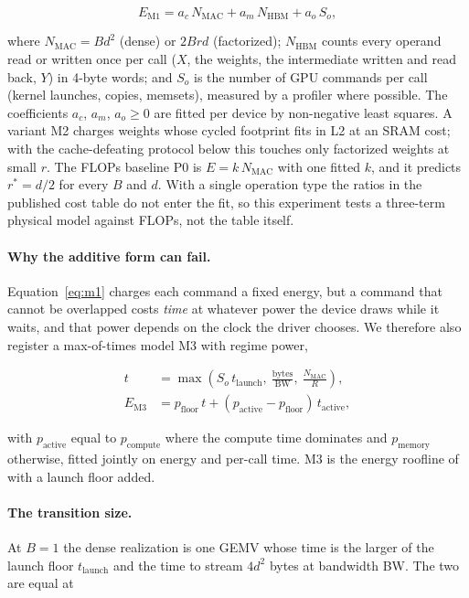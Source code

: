 \documentclass{article}
\newcommand{\rstar}{r^{*}}
\begin{document}
\begin{equation}
E_{\mathrm{M1}} = a_c\, N_{\mathrm{MAC}} + a_m\, N_{\mathrm{HBM}} + a_o\, S_o,
\label{eq:m1}
\end{equation}

where $N_{\mathrm{MAC}} = B d^2$ (dense) or $2 B r d$ (factorized); $N_{\mathrm{HBM}}$ counts every operand read or written once per call ($X$, the weights, the intermediate written and read back, $Y$) in 4-byte words; and $S_o$ is the number of GPU commands per call (kernel launches, copies, memsets), measured by a profiler where possible. The coefficients $a_c$, $a_m$, $a_o \geq 0$ are fitted per device by non-negative least squares. A variant M2 charges weights whose cycled footprint fits in L2 at an SRAM cost; with the cache-defeating protocol below this touches only factorized weights at small $r$. The FLOPs baseline P0 is $E = k\, N_{\mathrm{MAC}}$ with one fitted $k$, and it predicts $\rstar = d/2$ for every $B$ and $d$. With a single operation type the ratios in the published cost table do not enter the fit, so this experiment tests a three-term physical model against FLOPs, not the table itself.

\paragraph{Why the additive form can fail.} Equation~\ref{eq:m1} charges each command a fixed energy, but a command that cannot be overlapped costs \emph{time} at whatever power the device draws while it waits, and that power depends on the clock the driver chooses. We therefore also register a max-of-times model M3 with regime power,

\begin{align}
t &= \max\!\left(S_o\, t_{\mathrm{launch}},\ \tfrac{\mathrm{bytes}}{\mathrm{BW}},\ \tfrac{N_{\mathrm{MAC}}}{R}\right), \nonumber \\
E_{\mathrm{M3}} &= p_{\mathrm{floor}}\, t + (p_{\mathrm{active}} - p_{\mathrm{floor}})\, t_{\mathrm{active}},
\label{eq:m3}
\end{align}

with $p_{\mathrm{active}}$ equal to $p_{\mathrm{compute}}$ where the compute time dominates and $p_{\mathrm{memory}}$ otherwise, fitted jointly on energy and per-call time. M3 is the energy roofline of \citet{choi2013roofline} with a launch floor added.

\paragraph{The transition size.} At $B = 1$ the dense realization is one GEMV whose time is the larger of the launch floor $t_{\mathrm{launch}}$ and the time to stream $4 d^2$ bytes at bandwidth BW. The two are equal at
\end{document}
